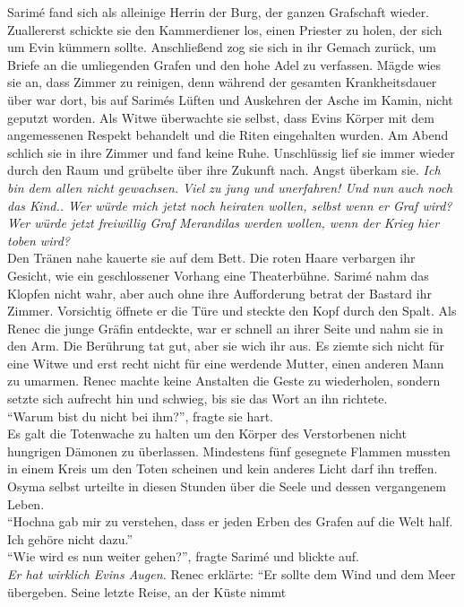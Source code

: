 Sarimé fand sich als alleinige Herrin der Burg, der ganzen Grafschaft wieder. Zuallererst schickte 
sie den Kammerdiener los, einen Priester zu holen, der sich um Evin kümmern sollte. Anschließend 
zog sie sich in ihr Gemach zurück, um Briefe an die umliegenden Grafen und den hohe Adel zu 
verfassen. Mägde wies sie an, dass Zimmer zu reinigen, denn während der gesamten Krankheitsdauer 
über war dort, bis auf Sarimés Lüften und Auskehren der Asche im Kamin, nicht geputzt worden. Als 
Witwe überwachte sie selbst, dass Evins Körper mit dem angemessenen Respekt behandelt und die Riten 
eingehalten wurden. Am Abend schlich sie in ihre Zimmer und fand keine Ruhe. Unschlüssig lief sie 
immer wieder durch den Raum und grübelte über ihre Zukunft nach. Angst überkam sie.
\textit{Ich bin dem allen nicht gewachsen. Viel zu jung und unerfahren! Und nun auch noch das 
Kind.. Wer würde mich jetzt noch heiraten wollen, selbst wenn er Graf wird? Wer würde jetzt 
freiwillig Graf Merandilas werden wollen, wenn der Krieg hier toben wird?}\\
Den Tränen nahe kauerte sie auf dem Bett. Die roten Haare verbargen ihr Gesicht, wie ein 
geschlossener Vorhang eine Theaterbühne. Sarimé nahm das Klopfen nicht wahr, aber auch ohne ihre 
Aufforderung betrat der Bastard ihr Zimmer. Vorsichtig öffnete er die Türe und steckte den Kopf 
durch den Spalt. Als Renec die junge Gräfin entdeckte, war er schnell an ihrer Seite und nahm sie 
in den Arm. Die Berührung tat gut, aber sie wich ihr aus. Es ziemte sich nicht für eine Witwe und 
erst recht nicht für eine werdende Mutter, einen anderen Mann zu umarmen. Renec machte keine 
Anstalten die Geste zu wiederholen, sondern setzte sich aufrecht hin und schwieg, bis sie das Wort 
an ihn richtete.\\
``Warum bist du nicht bei ihm?'', fragte sie hart.\\
Es galt die Totenwache zu halten um den Körper des Verstorbenen nicht hungrigen Dämonen zu 
überlassen. Mindestens fünf gesegnete Flammen mussten in einem Kreis um den Toten scheinen und kein 
anderes Licht darf ihn treffen. Osyma selbst urteilte in diesen Stunden über die Seele und dessen 
vergangenem Leben.\\
``Hochna gab mir zu verstehen, dass er jeden Erben des Grafen auf die Welt half. Ich gehöre nicht 
dazu.''\\
``Wie wird es nun weiter gehen?'', fragte Sarimé und blickte auf.\\
\textit{Er hat wirklich Evins Augen.}
Renec erklärte: ``Er sollte dem Wind und dem Meer übergeben. Seine letzte Reise, an der Küste nimmt 
